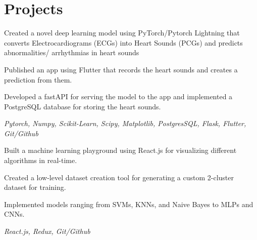 \documentclass[]{deedy-resume-openfont}
\begin{document}
\begin{minipage}[t]{0.66\textwidth}

\section{Projects}

\vspace{\topsep} %
\begin{tightemize}
    \item Created a novel deep learning model using PyTorch/Pytorch Lightning that converts Electrocardiograms (ECGs) into Heart Sounds (PCGs) and predicts abnormalities/ arrhythmias in heart sounds
    \item Published an app using Flutter that records the heart sounds and creates a prediction from them.
    \item Developed a fastAPI for serving the model to the app and implemented a PostgreSQL database for storing the heart sounds.
\end{tightemize}
\textit{Pytorch, Numpy, Scikit-Learn, Scipy, Matplotlib, PostgresSQL, Flask, Flutter, Git/Github}
\sectionsep

\begin{tightemize}

    \item Built a machine learning playground using React.js for visualizing different algorithms in real-time.
    \item Created a low-level dataset creation tool for generating a custom 2-cluster dataset for training.
    \item Implemented models ranging from SVMs, KNNs, and Naive Bayes to MLPs and CNNs.
\end{tightemize}
\textit{React.js, Redux, Git/Github}
\sectionsep


\end{minipage}
\end{document}
